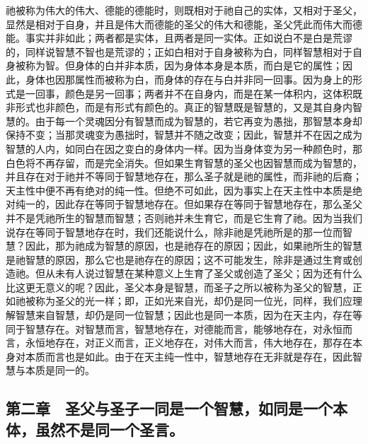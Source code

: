 祂被称为伟大的伟大、德能的德能时，则既相对于祂自己的实体，又相对于圣父，显然是相对于自身，并且是伟大而德能的圣父的伟大和德能，圣父凭此而伟大而德能。事实并非如此；两者都是实体，且两者是同一实体。正如说白不是白是荒谬的，同样说智慧不智也是荒谬的；正如白相对于自身被称为白，同样智慧相对于自身被称为智。但身体的白并非本质，因为身体本身是本质，而白是它的属性；因此，身体也因那属性而被称为白，而身体的存在与白并非同一回事。因为身上的形式是一回事，颜色是另一回事；两者并不在自身内，而是在某一体积内，这体积既非形式也非颜色，而是有形式有颜色的。真正的智慧既是智慧的，又是其自身内智慧的。由于每一个灵魂因分有智慧而成为智慧的，若它再变为愚拙，那智慧本身却保持不变；当那灵魂变为愚拙时，智慧并不随之改变；因此，智慧并不在因之成为智慧的人内，如同白在因之变白的身体内一样。因为当身体变为另一种颜色时，那白色将不再存留，而是完全消失。但如果生育智慧的圣父也因智慧而成为智慧的，并且存在对于祂并不等同于智慧地存在，那么圣子就是祂的属性，而非祂的后裔；天主性中便不再有绝对的纯一性。但绝不可如此，因为事实上在天主性中本质是绝对纯一的，因此存在等同于智慧地存在。但如果存在等同于智慧地存在，那么圣父并不是凭祂所生的智慧而智慧；否则祂并未生育它，而是它生育了祂。因为当我们说存在等同于智慧地存在时，我们还能说什么，除非祂是凭祂所是的那一位而智慧？因此，那为祂成为智慧的原因，也是祂存在的原因；因此，如果祂所生的智慧是祂智慧的原因，那么它也是祂存在的原因；这不可能发生，除非是通过生育或创造祂。但从未有人说过智慧在某种意义上生育了圣父或创造了圣父；因为还有什么比这更无意义的呢？因此，圣父本身是智慧，而圣子之所以被称为圣父的智慧，正如祂被称为圣父的光一样；即，正如光来自光，却仍是同一位光，同样，我们应理解智慧来自智慧，却仍是同一位智慧；因此也是同一本质，因为在天主内，存在等同于智慧存在。对智慧而言，智慧地存在，对德能而言，能够地存在，对永恒而言，永恒地存在，对正义而言，正义地存在，对伟大而言，伟大地存在，那存在本身对本质而言也是如此。由于在天主纯一性中，智慧地存在无非就是存在，因此智慧与本质是同一的。\par


\subsection{第二章　圣父与圣子一同是一个智慧，如同是一个本体，虽然不是同一个圣言。}

